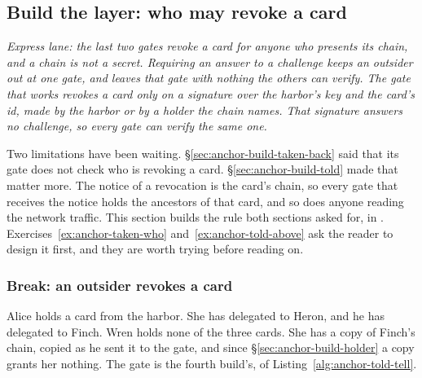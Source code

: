 %
%
\subsection{Build the layer: who may revoke a card}
\label{sec:anchor-build-warranted}

\noindent\emph{Express lane: the last two gates revoke a card for
anyone who presents its chain, and a chain is not a secret. Requiring an
answer to a challenge keeps an outsider out at one gate, and leaves that
gate with nothing the others can verify. The gate that works revokes a card
only on a signature over the harbor's key and the card's id, made by the
harbor or by a holder the chain names. That signature answers no challenge,
so every gate can verify the same one.}

Two limitations have been waiting. \S\ref{sec:anchor-build-taken-back} said
that its gate does not check who is revoking a card.
\S\ref{sec:anchor-build-told} made that matter more. The notice of a
revocation is the card's chain, so every gate that receives the notice
holds the ancestors of that card, and so does anyone reading the network
traffic. This section builds
the rule both sections asked for, in \pdkernelname{}.
Exercises~\ref{ex:anchor-taken-who} and~\ref{ex:anchor-told-above} ask the
reader to design it first, and they are worth trying before reading on.

\subsubsection{Break: an outsider revokes a card}

Alice holds a card from the harbor. She has delegated to Heron, and he
has delegated to Finch. Wren holds none of the three cards. She has a copy
of Finch's chain, copied as he sent it to the gate, and since
\S\ref{sec:anchor-build-holder} a copy grants her nothing. The gate is
the fourth build's, of Listing~\ref{alg:anchor-told-tell}.

